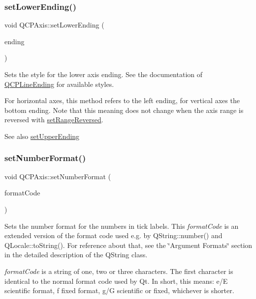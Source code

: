 \subsubsection{\texorpdfstring{set\+Lower\+Ending()}{setLowerEnding()}}
{\footnotesize\ttfamily void Q\+C\+P\+Axis\+::set\+Lower\+Ending (\begin{DoxyParamCaption}\item[{const \hyperlink{class_q_c_p_line_ending}{Q\+C\+P\+Line\+Ending} \&}]{ending }\end{DoxyParamCaption})}

Sets the style for the lower axis ending. See the documentation of \hyperlink{class_q_c_p_line_ending}{Q\+C\+P\+Line\+Ending} for available styles.

For horizontal axes, this method refers to the left ending, for vertical axes the bottom ending. Note that this meaning does not change when the axis range is reversed with \hyperlink{class_q_c_p_axis_a2172fdb196b1a0dc3f40992fcad8e9e1}{set\+Range\+Reversed}.

\begin{DoxySeeAlso}{See also}
\hyperlink{class_q_c_p_axis_a69119b892fc306f651763596685aa377}{set\+Upper\+Ending} 
\end{DoxySeeAlso}
\mbox{\label{class_q_c_p_axis_ae585a54dc2aac662e90a2ca82f002590}} 
\subsubsection{\texorpdfstring{set\+Number\+Format()}{setNumberFormat()}}
{\footnotesize\ttfamily void Q\+C\+P\+Axis\+::set\+Number\+Format (\begin{DoxyParamCaption}\item[{const Q\+String \&}]{format\+Code }\end{DoxyParamCaption})}

Sets the number format for the numbers in tick labels. This {\itshape format\+Code} is an extended version of the format code used e.\+g. by Q\+String\+::number() and Q\+Locale\+::to\+String(). For reference about that, see the \char`\"{}\+Argument Formats\char`\"{} section in the detailed description of the Q\+String class.

{\itshape format\+Code} is a string of one, two or three characters. The first character is identical to the normal format code used by Qt. In short, this means\+: \textquotesingle{}e\textquotesingle{}/\textquotesingle{}E\textquotesingle{} scientific format, \textquotesingle{}f\textquotesingle{} fixed format, \textquotesingle{}g\textquotesingle{}/\textquotesingle{}G\textquotesingle{} scientific or fixed, whichever is shorter.


